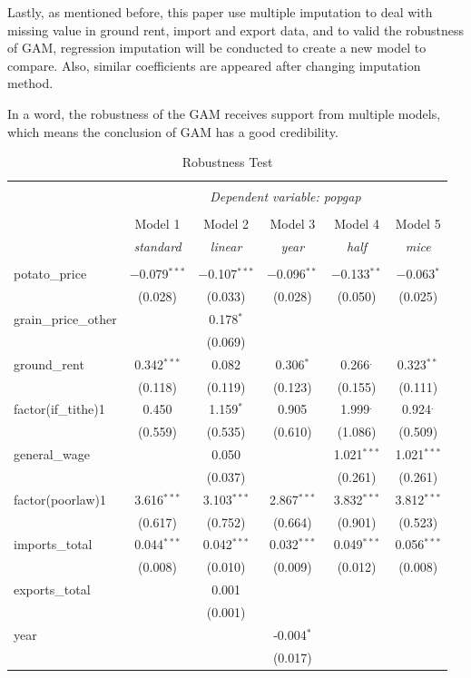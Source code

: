 Lastly, as mentioned before, this paper use multiple imputation to deal with missing value in ground rent, import and export data, and to valid the robustness of GAM, regression imputation will be conducted to create a new model to compare. Also, similar coefficients are appeared after changing imputation method. 

In a word, the robustness of the GAM receives support from multiple models, which means the conclusion of GAM has a good credibility.

\begin{table}[h]
    \centering
    \caption{Robustness Test}
    \begin{tabular}{@{\extracolsep{5pt}}lccccc}
    \\[-1.8ex]\hline
    \hline \\[-1.8ex]
    & \multicolumn{5}{c}{\textit{Dependent variable: popgap}} \\
    \cline{2-6}
    \\[-1.8ex] & Model 1 & Model 2 & Model 3 & Model 4 & Model 5 \\
    & \textit{standard} & \textit{linear} & \textit{year} & \textit{half} & \textit{mice} \\
    \hline \\[-1.8ex]
    potato\_price & $-$0.079$^{***}$ & $-$0.107$^{***}$ & $-$0.096$^{**}$ & $-$0.133$^{**}$ & $-$0.063$^{*}$ \\
     & (0.028) & (0.033) & (0.028) & (0.050) & (0.025) \\
    grain\_price\_other & & 0.178$^{*}$ &  & & \\
     & & (0.069) &  & & \\
    ground\_rent & 0.342$^{***}$ & 0.082 & 0.306$^{*}$ & 0.266$^{.}$ & 0.323$^{**}$ \\
     & (0.118) & (0.119) & (0.123) & (0.155) & (0.111) \\
    factor(if\_tithe)1 & 0.450 & 1.159$^{*}$ & 0.905 & 1.999$^{.}$ & 0.924$^{.}$ \\
     & (0.559) & (0.535) & (0.610) & (1.086) & (0.509) \\
    general\_wage & & 0.050 & & 1.021$^{***}$ & 1.021$^{***}$ \\
     & & (0.037) & & (0.261) & (0.261) \\
    factor(poorlaw)1 & 3.616$^{***}$ & 3.103$^{***}$ & 2.867$^{***}$ & 3.832$^{***}$ & 3.812$^{***}$ \\
     & (0.617) & (0.752) & (0.664) & (0.901) & (0.523) \\
    imports\_total & 0.044$^{***}$ & 0.042$^{***}$ & 0.032$^{***}$ & 0.049$^{***}$ & 0.056$^{***}$ \\
     & (0.008) & (0.010) & (0.009) & (0.012) & (0.008) \\
    exports\_total & & 0.001 & & & \\
     & & (0.001) & & & \\
    year & & & -0.004$^{*}$ & & \\
     & & & (0.017) & & \\ 


\end{tabular}
\end{table}
